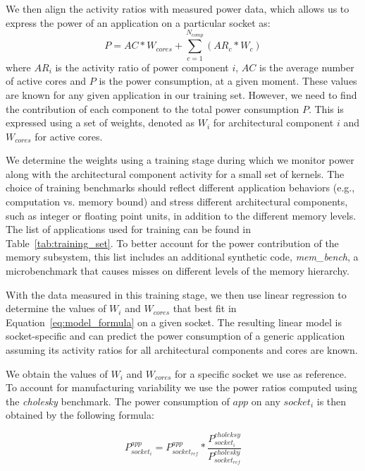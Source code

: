 \par
We then align the activity ratios with measured power data, which allows us to express the
power of an application on a particular socket as: 
\begin{equation}
	\label{eq:model_formula} 
	P = AC * W_{cores} + \sum_{c=1}^{N_{comp}} ( AR_c * W_c )
\end{equation} 
where $AR_i$ is the activity ratio of power component $i$, $AC$ is the average number of
active cores and $P$ is the power consumption, at a given moment.  These values are known
for any given application in our training set.  However, we need to find the contribution
of each component to the total power consumption $P$.  This is expressed using a set of
weights, denoted as $W_i$ for architectural component $i$ and $W_{cores}$ for active
cores.
\par
We determine the weights using a training stage during which we monitor power along with
the architectural component activity for a small set of kernels.  The choice of training
benchmarks should reflect different application behaviors (e.g., computation vs. memory
bound) and stress different architectural components, such as integer or floating point
units, in addition to the different memory levels.  The list of applications used for
training can be found in Table~\ref{tab:training_set}.  To better account for the power
contribution of the memory subsystem, this list includes an additional synthetic code,
\textit{mem\_bench}, a microbenchmark that causes misses on different levels of the memory
hierarchy. 
\par
With the data measured in this training stage, we then use linear regression to determine
the values of $W_i$ and $W_{cores}$ that best fit in Equation~\ref{eq:model_formula} on a
given socket. The resulting linear model is socket-specific and can predict the power
consumption of a generic  application assuming its activity ratios for all architectural
components and cores are known.
\par
We obtain the values of $W_i$ and $W_{cores}$ for a specific socket we use as reference.
To account for manufacturing variability we use
the power ratios computed using the \textit{cholesky} benchmark.  The power consumption of
$app$ on any $socket_i$ is then obtained by the following formula:

\begin{equation}
\label{eq:naive_model}
P_{socket_{i}}^{app} = P_{socket_{ref}}^{app} * \frac{P_{socket_{i}}^{choleksy}}{P_{socket_{ref}}^{cholesky}}
\end{equation}

